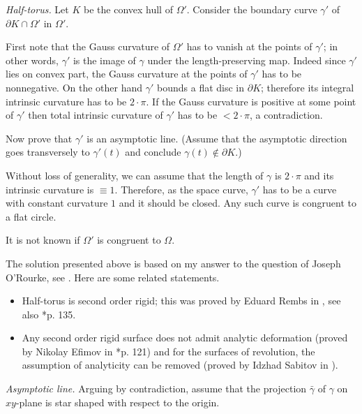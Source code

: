 \textit{Half-torus.}
Let $K$ be the convex hull of $\Omega'$.
Consider the boundary curve $\gamma'$ of $\partial K\cap \Omega'$ in $\Omega'$.

First note that the Gauss curvature of $\Omega'$ has to vanish at the points of $\gamma'$;
in other words, $\gamma'$ is the image of $\gamma$ 
under the length-preserving map.
Indeed since $\gamma'$ lies on convex part, 
the Gauss curvature at the points of $\gamma'$ has to be nonnegative. 
On the other hand $\gamma'$ bounds a flat disc in $\partial K$;
therefore its integral intrinsic curvature has to be $2{\cdot}\pi$.
If the Gauss curvature is positive at some point of $\gamma'$ then total intrinsic curvature of $\gamma'$ has to be $<2{\cdot}\pi$, a contradiction.

Now prove that $\gamma'$ is an asymptotic line.
(Assume that the asymptotic direction goes transversely to $\gamma'(t)$ and conclude $\gamma(t)\notin\partial K$.)

Without loss of generality, we can assume that the length of $\gamma$ is $2{\cdot}\pi$ and its intrinsic curvature is $\equiv 1$.
Therefore, as the space curve,
$\gamma'$ has to be a curve with constant curvature $1$ and it should be closed.
Any such curve is congruent to a flat circle.

 It is not known if $\Omega'$ is congruent to $\Omega$.

The solution presented above is based on my answer 
to the question of Joseph O'Rourke, see \cite{rourke}.
Here are some related statements.
\begin{itemize}
\item Half-torus is second order rigid;
this was proved by Eduard Rembs in
\cite{rembs}, see also \cite{efimov}*{p. 135}.
\item Any second order rigid surface does not admit analytic deformation (proved by Nikolay Efimov in \cite{efimov}*{p. 121})
and for the surfaces of revolution, the assumption of analyticity can be removed (proved by Idzhad Sabitov in \cite{sabitov}).
\end{itemize}






\textit{Asymptotic line.}
Arguing by contradiction, assume that the projection $\bar\gamma$
of $\gamma$ on $x y$-plane is star shaped with respect to the origin.


